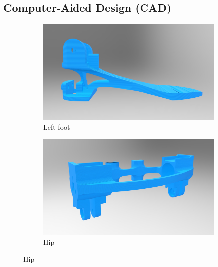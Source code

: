\subsection{Computer-Aided Design (CAD)} %
\label{sub:computer_aided_design}

\begin{figure}[ht!]
    \centering
    \begin{subfigure}[b]{0.49\textwidth}
        \includegraphics[width=\textwidth]{figures/legs_foot.jpg}
        \caption{Left foot}
        \label{fig:left_foot}
    \end{subfigure}
    \begin{subfigure}[b]{0.49\textwidth}
        \includegraphics[width=\textwidth]{figures/legs_hip.jpg}
        \caption{Hip}
        \label{fig:hip}
    \end{subfigure}


\end{figure}
